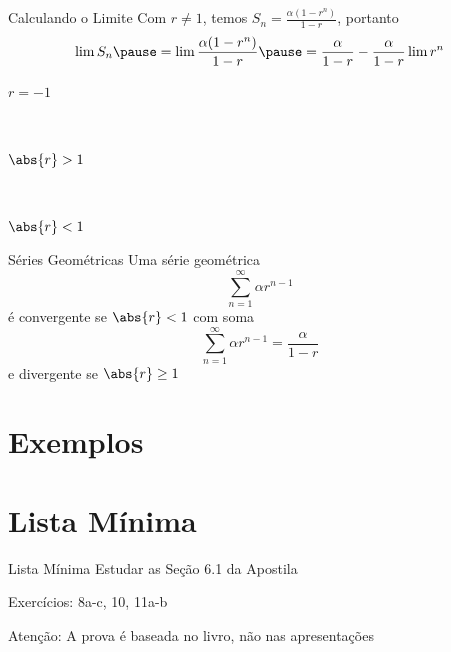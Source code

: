 \documentclass[fleqn,utf8,aspectratio=169,12pt]{beamer}
\begin{document}
\begin{frame}{Calculando o Limite}
	Com $r\neq 1$, temos \(S_n = \frac{\alpha(1-r^n)}{1-r}\),
  \pause
  portanto
  \[
    \lim S_n
    \pause
    = \lim \frac{\alpha(1-r^n)}{1-r}
    \pause
    = \frac{\alpha}{1-r} -\frac{\alpha}{1-r} \lim r^n
  \]
  \pause
  \vspace{-\baselineskip}
	\begin{description}
		\item[$r=-1$] \tabto{10mm}
		 \\[7mm]
		\item[$\abs{r}>1$] \tabto{10mm}
		 \\[7mm]
		\item[$\abs{r}<1$] \tabto{10mm}
	\end{description}
\end{frame}

\begin{frame}{Séries Geométricas}
	Uma série geométrica
	\[
    \sum_{n=1}^\infty \alpha r^{n-1}
  \]
	é convergente se $\abs{r}<1$ com soma
	\[
    \sum_{n=1}^\infty \alpha r^{n-1} = \frac{\alpha }{1-r}
  \]
	e divergente se $\abs{r}\geq 1$
\end{frame}

\section{Exemplos}

\section{Lista Mínima}

\begin{frame}{Lista Mínima}
  Estudar as Seção 6.1 da Apostila

  \vspace{\baselineskip}
  Exercícios: 8a-c, 10, 11a-b

  \vfill
  Atenção: A prova é baseada no livro, não nas apresentações
\end{frame}

\end{document}

